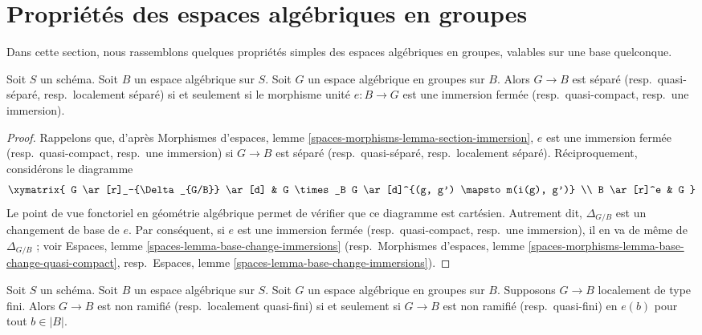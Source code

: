 \section{Propriétés des espaces algébriques en groupes}
\label{section-properties-group-spaces}

\noindent
Dans cette section, nous rassemblons quelques propriétés simples des espaces algébriques en groupes, valables sur une base quelconque.

\begin{lemma}
\label{lemma-group-scheme-separated}
Soit $S$ un schéma. Soit $B$ un espace algébrique sur $S$. Soit $G$ un espace algébrique en groupes sur $B$. Alors $G \to B$ est séparé (resp.\ quasi-séparé, resp.\ localement séparé) si et seulement si le morphisme unité $e : B \to G$ est une immersion fermée (resp.\ quasi-compact, resp.\ une immersion).
\end{lemma}

\begin{proof}
Rappelons que, d'après Morphismes d'espaces, lemme \ref{spaces-morphisms-lemma-section-immersion}, $e$ est une immersion fermée (resp.\ quasi-compact, resp.\ une immersion) si $G \to B$ est séparé (resp.\ quasi-séparé, resp.\ localement séparé). Réciproquement, considérons le diagramme
$$
\xymatrix{
G \ar[r]_-{\Delta_{G/B}} \ar[d] &
G \times_B G \ar[d]^{(g, g') \mapsto m(i(g), g')} \\
B \ar[r]^e & G
}
$$
Le point de vue fonctoriel en géométrie algébrique permet de vérifier que ce diagramme est cartésien. Autrement dit, $\Delta_{G/B}$ est un changement de base de $e$. Par conséquent, si $e$ est une immersion fermée (resp.\ quasi-compact, resp.\ une immersion), il en va de même de $\Delta_{G/B}$ ; voir Espaces, lemme \ref{spaces-lemma-base-change-immersions} (resp.\ Morphismes d'espaces, lemme \ref{spaces-morphisms-lemma-base-change-quasi-compact}, resp.\ Espaces, lemme \ref{spaces-lemma-base-change-immersions}).
\end{proof}

\begin{lemma}
\label{lemma-group-scheme-unramified-or-lqf}
Soit $S$ un schéma. Soit $B$ un espace algébrique sur $S$. Soit $G$ un espace algébrique en groupes sur $B$. Supposons $G \to B$ localement de type fini. Alors $G \to B$ est non ramifié (resp.\ localement quasi-fini) si et seulement si $G \to B$ est non ramifié (resp.\ quasi-fini) en $e(b)$ pour tout $b \in |B|$.
\end{lemma}

